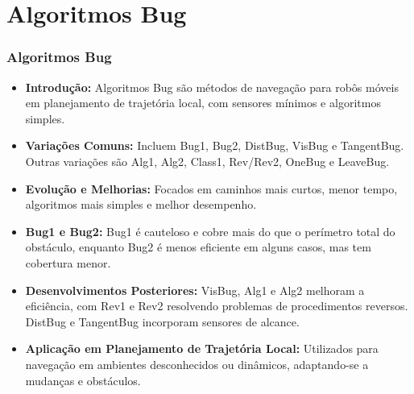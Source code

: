 \documentclass[xcolor=dvipsnames, aspectratio=169]{beamer}
\begin{document}
\section{Algoritmos Bug}
\begin{frame}
  \frametitle{Algoritmos Bug}
  \begin{itemize}
    \item \textbf{Introdução:} Algoritmos Bug são métodos de navegação para robôs móveis em planejamento de trajetória local, com sensores mínimos e algoritmos simples.
    \item \textbf{Variações Comuns:} Incluem Bug1, Bug2, DistBug, VisBug e TangentBug. Outras variações são Alg1, Alg2, Class1, Rev/Rev2, OneBug e LeaveBug.
    \item \textbf{Evolução e Melhorias:} Focados em caminhos mais curtos, menor tempo, algoritmos mais simples e melhor desempenho.
    \item \textbf{Bug1 e Bug2:} Bug1 é cauteloso e cobre mais do que o perímetro total do obstáculo, enquanto Bug2 é menos eficiente em alguns casos, mas tem cobertura menor.
    \item \textbf{Desenvolvimentos Posteriores:} VisBug, Alg1 e Alg2 melhoram a eficiência, com Rev1 e Rev2 resolvendo problemas de procedimentos reversos. DistBug e TangentBug incorporam sensores de alcance.
    \item \textbf{Aplicação em Planejamento de Trajetória Local:} Utilizados para navegação em ambientes desconhecidos ou dinâmicos, adaptando-se a mudanças e obstáculos.
  \end{itemize}

\end{frame}

\end{document}
